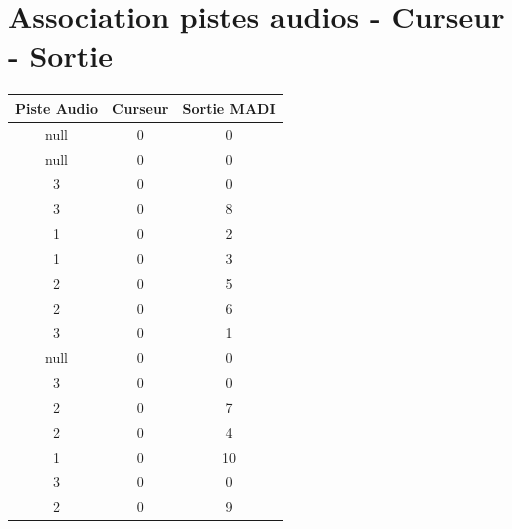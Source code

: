 \documentclass[12pt,a4paper]{report}
\begin{document}
 \chapter*{Association pistes audios - Curseur - Sortie}
 \begin{center}
 \begin{tabular}{|c|c|c|}
 \hline 
 Piste Audio & Curseur & Sortie MADI \\ 
\hline 
null & 0 & 0 \\ 
 \hline 
null & 0 & 0 \\ 
 \hline 
3 & 0 & 0 \\ 
 \hline 
3 & 0 & 8 \\ 
 \hline 
1 & 0 & 2 \\ 
 \hline 
1 & 0 & 3 \\ 
 \hline 
2 & 0 & 5 \\ 
 \hline 
2 & 0 & 6 \\ 
 \hline 
3 & 0 & 1 \\ 
 \hline 
null & 0 & 0 \\ 
 \hline 
3 & 0 & 0 \\ 
 \hline 
2 & 0 & 7 \\ 
 \hline 
2 & 0 & 4 \\ 
 \hline 
1 & 0 & 10 \\ 
 \hline 
3 & 0 & 0 \\ 
 \hline 
2 & 0 & 9 \\ 
 \hline 

 \end{tabular}  

 \end{center}
\end{document}
